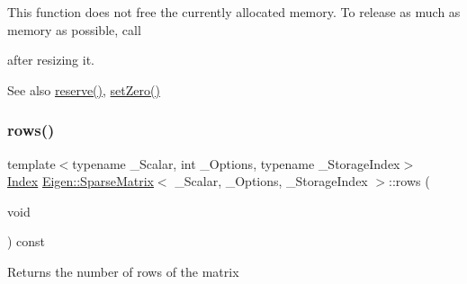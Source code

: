 This function does not free the currently allocated memory. To release as much as memory as possible, call
\begin{DoxyCode}{0}
\end{DoxyCode}
 after resizing it.

\begin{DoxySeeAlso}{See also}
\mbox{\hyperlink{class_eigen_1_1_sparse_matrix_a1518e58ac49bed0e2385b722a034f7d3}{reserve()}}, \mbox{\hyperlink{class_eigen_1_1_sparse_matrix_ad3c7416090f913e8685523cb3ab7c2f7}{set\+Zero()}} 
\end{DoxySeeAlso}
\mbox{\label{class_eigen_1_1_sparse_matrix_a62e61bb861eee306d5b069ce652b5aa5}} 
\subsubsection{\texorpdfstring{rows()}{rows()}}
{\footnotesize\ttfamily template$<$typename \+\_\+\+Scalar, int \+\_\+\+Options, typename \+\_\+\+Storage\+Index$>$ \\
\mbox{\hyperlink{struct_eigen_1_1_eigen_base_a554f30542cc2316add4b1ea0a492ff02}{Index}} \mbox{\hyperlink{class_eigen_1_1_sparse_matrix}{Eigen\+::\+Sparse\+Matrix}}$<$ \+\_\+\+Scalar, \+\_\+\+Options, \+\_\+\+Storage\+Index $>$\+::rows (\begin{DoxyParamCaption}\item[{void}]{ }\end{DoxyParamCaption}) const\hspace{0.3cm}{\ttfamily [inline]}}

\begin{DoxyReturn}{Returns}
the number of rows of the matrix 
\end{DoxyReturn}
\mbox{\label{class_eigen_1_1_sparse_matrix_acc35051d698e3973f1de5b9b78dbe345}} 
